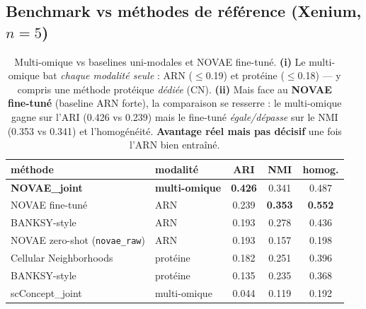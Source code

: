 \documentclass[11pt,a4paper]{article}
\newcommand{\best}[1]{\textbf{#1}}
\begin{document}
\subsection{Benchmark vs méthodes de référence (Xenium, $n{=}5$)}
\label{sec:bench}
\begin{table}[h]
\centering\small
\begin{tabular}{llccc}
\toprule
méthode & modalité & ARI & NMI & homog. \\
\midrule
\best{NOVAE\_joint} & \best{multi-omique} & \best{0.426} & 0.341 & 0.487 \\
NOVAE fine-tuné & ARN & 0.239 & \best{0.353} & \best{0.552} \\
BANKSY-style & ARN & 0.193 & 0.278 & 0.436 \\
NOVAE zero-shot (\texttt{novae\_raw}) & ARN & 0.193 & 0.157 & 0.198 \\
Cellular Neighborhoods & protéine & 0.182 & 0.251 & 0.396 \\
BANKSY-style & protéine & 0.135 & 0.235 & 0.368 \\
scConcept\_joint & multi-omique & 0.044 & 0.119 & 0.192 \\
\bottomrule
\end{tabular}
\caption{Multi-omique vs baselines uni-modales et NOVAE fine-tuné.
\textbf{(i)} Le multi-omique bat \emph{chaque modalité seule} : ARN ($\le$0.19) et protéine
($\le$0.18) --- y compris une méthode protéique \emph{dédiée} (CN). \textbf{(ii)} Mais face
au \textbf{NOVAE fine-tuné} (baseline ARN forte), la comparaison se resserre : le
multi-omique gagne sur l'ARI (0.426 vs 0.239) mais le fine-tuné \emph{égale/dépasse} sur le
NMI (0.353 vs 0.341) et l'homogénéité. \textbf{Avantage réel mais pas décisif} une fois
l'ARN bien entraîné.}
\end{table}

\end{document}

